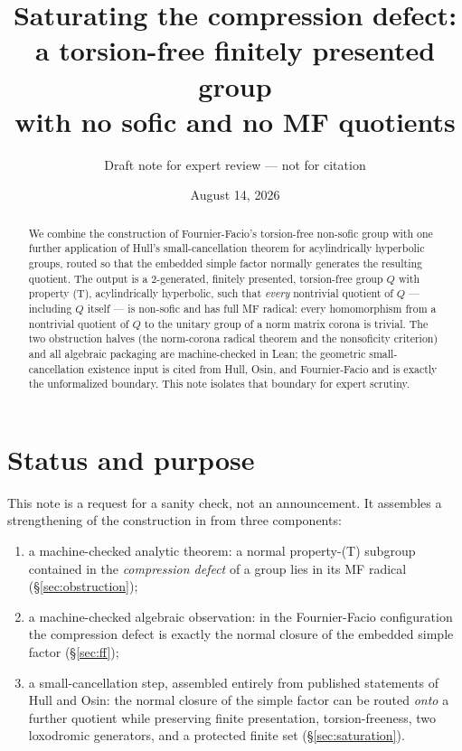 \documentclass[11pt]{amsart}
\title[Saturating the compression defect]{Saturating the compression defect:\\
a torsion-free finitely presented group\\ with no sofic and no MF quotients}
\author{Draft note for expert review --- not for citation}
\date{August 14, 2026}
\theoremstyle{remark}
\theoremstyle{definition}
\begin{document}
\begin{abstract}
We combine the construction of Fournier-Facio's torsion-free non-sofic
group with one further application of Hull's small-cancellation theorem for
acylindrically hyperbolic groups, routed so that the embedded simple factor
normally generates the resulting quotient.  The output is a
$2$-generated, finitely presented, torsion-free group $Q$ with property
\textup{(T)}, acylindrically hyperbolic, such that \emph{every} nontrivial
quotient of $Q$ --- including $Q$ itself --- is non-sofic and has full MF
radical: every homomorphism from a nontrivial quotient of $Q$ to the unitary
group of a norm matrix corona is trivial.  The two obstruction halves
(the norm-corona radical theorem and the nonsoficity criterion) and all
algebraic packaging are machine-checked in Lean; the geometric
small-cancellation existence input is cited from Hull, Osin, and
Fournier-Facio and is exactly the unformalized boundary.  This note isolates
that boundary for expert scrutiny.
\end{abstract}

\maketitle

\section{Status and purpose}\label{sec:status}

This note is a request for a sanity check, not an announcement.  It
assembles a strengthening of the construction in \cite{FFF} from three
components:

\begin{enumerate}
\item a machine-checked analytic theorem: a normal property-\textup{(T)}
  subgroup contained in the \emph{compression defect} of a group lies in its
  MF radical (\S\ref{sec:obstruction});
\item a machine-checked algebraic observation: in the Fournier-Facio
  configuration the compression defect is exactly the normal closure of the
  embedded simple factor (\S\ref{sec:ff});
\item a small-cancellation step, assembled entirely from published
  statements of Hull and Osin: the normal closure of the simple factor can be
  routed \emph{onto} a further quotient while preserving finite presentation,
  torsion-freeness, two loxodromic generators, and a protected finite set
  (\S\ref{sec:saturation}).
\end{enumerate}
\end{document}
